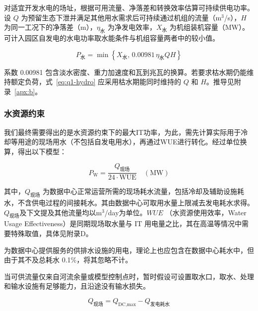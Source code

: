 对适宜开发水电的场址，根据可用流量、净落差和转换效率估算可持续供电功率\cite{q1ref06}。设 $Q$ 为预留生态下泄并满足其他用水需求后可持续通过机组的流量（m$^3$/s），$H$ 为同一工况下的净落差（m），$\eta_{\text{水}}$ 为净发电效率，$X_{\text{水}}$ 为机组装机容量（MW）。可计入园区自发电的水电功率取水能条件与机组容量两者中的较小值。

\begin{equation}\label{eq:q1-hydro}
P_{\text{水}}=\min\!\left\{X_{\text{水}},\,0.00981\,\eta_{\text{水}}QH\right\}
\end{equation}

系数 0.00981 包含淡水密度、重力加速度和瓦到兆瓦的换算。若要求枯水期仍能维持额定负荷，式~\eqref{eq:q1-hydro} 应采用枯水期能同时维持的 $Q$ 和 $H$。推导见附录~\ref{apx:b}。

\subsubsection{水资源约束}\label{sec:q1-water}

我们最终需要得出的是水资源约束下的最大IT功率，为此，需先计算实际用于冷却等用途的现场用水（不包括自发电用水），再通过WUE进行转化。经过单位换算，得出以下模型：

\begin{equation}\label{eq:q1-pw}
P_{\text{W}}= \frac{Q_{\text{现场}}}{24\cdot\mathrm{WUE}}\quad(\text{MW})
\end{equation}

其中，$Q_{\text{现场}}$ 为数据中心正常运营所需的现场耗水流量，包括冷却及辅助设施耗水，不含供电过程的间接耗水。其由数据中心可取用水量上限减去发电耗水求得。$Q_{\text{现场}}$及下文提及其他流量均以m$^3$/day为单位。$WUE$ （水资源使用效率，Water Usage Effectiveness）是同期现场取水量与 IT 用电量之比，其在高温等情况中需要特殊取值，具体见附录D。\cite{q1bref04}

为数据中心提供服务的供排水设施的用电，理论上也应包含在数据中心耗水中，但由于其不及总耗水 0.1\%，将其忽略不计。\cite{q1bref09}

\begin{asum}[取输水条件理想]\label{asum:water-ideal}
当可供流量仅来自河流余量或模型控制点时，暂时假设可设置取水口，取水、处理和输水设施有足够能力，且沿途没有输水损失。
\end{asum}

\begin{equation}\label{eq:q1-qfield}
Q_{\text{现场}}=Q_{\text{DC,max}}-Q_{\text{发电耗水}}
\end{equation}

